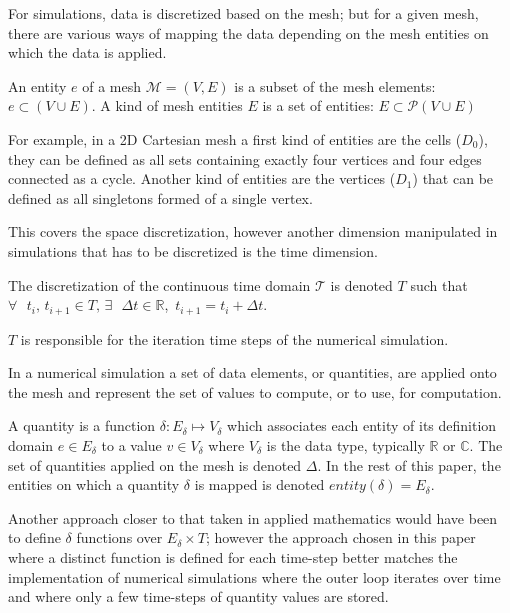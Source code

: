 For simulations, data is discretized based on the mesh; but for a given mesh, there are various ways of mapping the data depending on the mesh entities on which the data is applied.

\begin{mydef}
An entity $e$ of a mesh $\mathcal{M}=(V,E)$ is a subset of the mesh elements: $e\subset (V\cup E)$.
A kind of mesh entities $E$ is a set of entities: $E\subset \mathcal{P}(V\cup E)$
\end{mydef}
For example, in a 2D Cartesian mesh a first kind of entities are the cells ($D_0$), they can be defined as all sets containing exactly four vertices and four edges connected as a cycle. Another kind of entities are the vertices ($D_1$) that can be defined as all singletons formed of a single vertex.

This covers the space discretization, however another dimension manipulated in simulations that has to be discretized is the time dimension.
\begin{mydef}
The discretization of the continuous time domain $\mathcal{T}$ is denoted $T$ such that $\forall\mbox{ }t_i\mbox{, }t_{i+1} \in T\mbox{, }\exists\mbox{ }\Delta t \in \mathbb{R}$\mbox{, }$t_{i+1} = t_i + \Delta t$.
\end{mydef}
$T$ is responsible for the iteration time steps of the numerical simulation. 

In a numerical simulation a set of data elements, or quantities, are applied onto the mesh and represent the set of values to compute, or to use, for computation.
\begin{mydef}
A quantity is a function $\delta: E_{\delta} \mapsto V_{\delta}$ which associates each entity of its definition domain $e\in E_{\delta}$ to a value $v\in V_{\delta}$ where $V_{\delta}$ is the data type, typically $\mathbb{R}$ or $\mathbb{C}$.
The set of quantities applied on the mesh is denoted $\Delta$.
In the rest of this paper, the entities on which a quantity $\delta$ is mapped is denoted $entity(\delta)=E_{\delta}$.
\end{mydef}
Another approach closer to that taken in applied mathematics would have been to define $\delta$ functions over $E_{\delta} \times T$; however the approach chosen in this paper where a distinct function is defined for each time-step better matches the implementation of numerical simulations where the outer loop iterates over time and where only a few time-steps of quantity values are stored.

